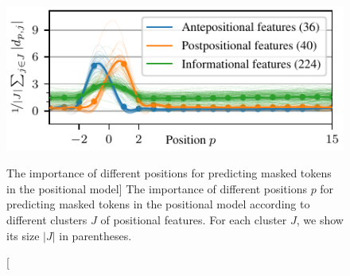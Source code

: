 \begin{figure}
\includegraphics{positional-features}
\vspace{-0.5cm}
\caption
  [The importance of different positions for predicting masked tokens in
   the positional model]%
  {The importance of different positions $p$ for predicting masked tokens in
   the positional model according to different clusters $J$ of positional
   features. For each cluster $J$, we show its size $|J|$ in parentheses.
   \cite[Figure 4]{novotny2021when}}
\label{fig:position-independent-token-embeddings-interpretability}
\end{figure}